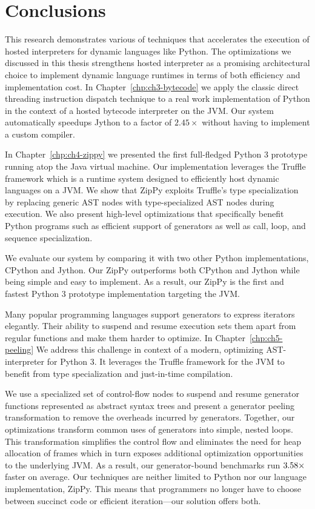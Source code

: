 \chapter{Conclusions}
\label{chp:ch9-conclusions}

This research demonstrates various of techniques that accelerates the execution of hosted interpreters for dynamic languages like Python.
The optimizations we discussed in this thesis strengthens hosted interpreter as a promising architectural choice to implement dynamic language runtimes in terms of both efficiency and implementation cost.
In Chapter~\ref{chp:ch3-bytecode} we apply the classic direct threading instruction dispatch technique to a real work implementation of Python in the context of a hosted bytecode interpreter on the JVM.
Our system automatically speedups Jython to a factor of $2.45\times$ without having to implement a custom compiler.

In Chapter~\ref{chp:ch4-zippy} we presented the first full-fledged Python 3 prototype running atop the Java virtual machine.
Our implementation leverages the Truffle framework which is a runtime system designed to efficiently host dynamic languages on a JVM.
We show that ZipPy exploits Truffle's type specialization by replacing generic AST nodes with type-specialized AST nodes during execution.
We also present high-level optimizations that specifically benefit Python programs such as efficient support of generators as well as call, loop, and sequence specialization.

We evaluate our system by comparing it with two other Python implementations, CPython and Jython.
Our ZipPy outperforms both CPython and Jython while being simple and easy to implement.
As a result, our ZipPy is the first and fastest Python 3 prototype implementation targeting the JVM.

Many popular programming languages support generators to express iterators elegantly.
Their ability to suspend and resume execution sets them apart from regular functions and make them harder to optimize. 
In Chapter~\ref{chp:ch5-peeling} We address this challenge in context of a modern, optimizing AST-interpreter for Python 3. 
It leverages the Truffle framework for the JVM to benefit from type specialization and just-in-time compilation.

We use a specialized set of control-flow nodes to suspend and resume generator functions represented as abstract syntax trees and present a generator peeling transformation to remove the overheads incurred by generators.
Together, our optimizations transform common uses of generators into simple, nested loops. 
This transformation simplifies the control flow and eliminates the need for heap allocation of frames which in turn exposes additional optimization opportunities to the underlying JVM.
As a result, our generator-bound benchmarks run $3.58{}\times$ faster on average.
Our techniques are neither limited to Python nor our language implementation, ZipPy.
This means that programmers no longer have to choose between succinct code or efficient iteration---our solution offers both.

